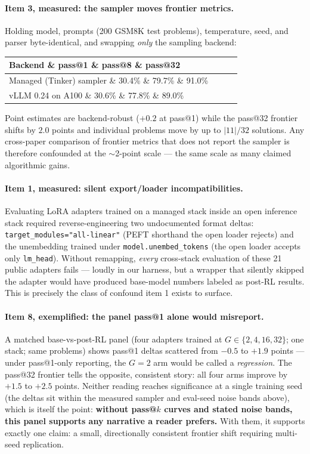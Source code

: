 \documentclass[11pt]{article}
\begin{document}
\paragraph{Item 3, measured: the sampler moves frontier metrics.}
Holding model, prompts (200 GSM8K test problems), temperature, seed, and
parser byte-identical, and swapping \emph{only} the sampling backend:
\begin{center}
\begin{tabular}{@{}lccc@{}}
\toprule
Backend \& pass@1 \& pass@8 \& pass@32 \\
\midrule
Managed (Tinker) sampler \& 30.4\% \& 79.7\% \& 91.0\% \\
vLLM 0.24 on A100 \& 30.6\% \& 77.8\% \& 89.0\% \\
\bottomrule
\end{tabular}
\end{center}
Point estimates are backend-robust ($+0.2$ at pass@1) while the pass@32
frontier shifts by $2.0$ points and individual problems move by up to
$|11|/32$ solutions. Any cross-paper comparison of frontier metrics that
does not report the sampler is therefore confounded at the
$\sim$2-point scale --- the same scale as many claimed algorithmic gains.

\paragraph{Item 1, measured: silent export/loader incompatibilities.}
Evaluating LoRA adapters trained on a managed stack inside an open
inference stack required reverse-engineering two undocumented format
deltas: \texttt{target\_modules="all-linear"} (PEFT shorthand the open
loader rejects) and the unembedding trained under
\texttt{model.unembed\_tokens} (the open loader accepts only
\texttt{lm\_head}). Without remapping, \emph{every} cross-stack evaluation
of these 21 public adapters fails --- loudly in our harness, but a wrapper
that silently skipped the adapter would have produced base-model numbers
labeled as post-RL results. This is precisely the class of confound item 1
exists to surface.

\paragraph{Item 8, exemplified: the panel pass@1 alone would misreport.}
A matched base-vs-post-RL panel (four adapters trained at
$G\in\{2,4,16,32\}$; one stack; same problems) shows pass@1 deltas
scattered from $-0.5$ to $+1.9$ points --- under pass@1-only reporting,
the $G{=}2$ arm would be called a \emph{regression}. The pass@32 frontier
tells the opposite, consistent story: all four arms improve by $+1.5$ to
$+2.5$ points. Neither reading reaches significance at a single training
seed (the deltas sit within the measured sampler and eval-seed noise
bands above), which is itself the point: \textbf{without pass@$k$ curves
and stated noise bands, this panel supports any narrative a reader
prefers.} With them, it supports exactly one claim: a small,
directionally consistent frontier shift requiring multi-seed replication.
\end{document}

